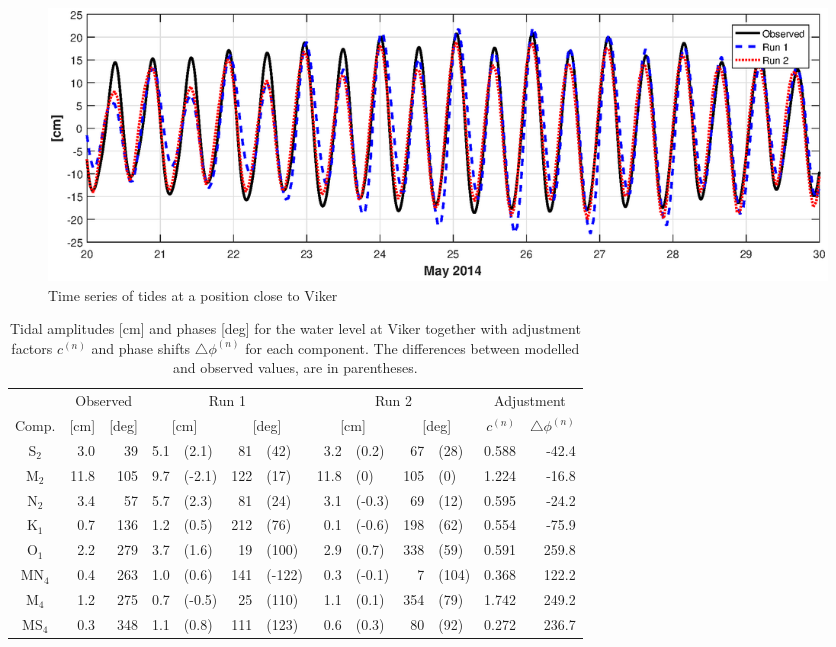 \begin{figure}[!t]
\centering
\includegraphics[width=\textwidth]{fig_Viker_timeseries}
\caption{Time series of tides at a position close to Viker}
\label{fig:Viker_timeseries}
\end{figure}



\begin{table}[ht]
\caption{Tidal amplitudes [cm] and phases [deg] for the water level at Viker  together with adjustment factors $c^{(n)}$ and phase shifts $\triangle \phi^{(n)}$ for each component. The differences between modelled and observed values, are in parentheses.}
\label{tab:Viker}
\centering
\begin{tabular}{crrr@{ }lr@{ }lr@{ }lr@{ }lrr} \hline
      & \multicolumn{2}{c}{Observed} & \multicolumn{4}{c}{Run 1} & \multicolumn{4}{c}{Run 2} & \multicolumn{2}{c}{Adjustment} \\
Comp. & [cm] & [deg] & \multicolumn{2}{c}{[cm]} & \multicolumn{2}{c}{[deg]} & \multicolumn{2}{c}{[cm]} & \multicolumn{2}{c}{[deg]} & $c^{(n)}$ & $\triangle \phi^{(n)}$  \\ \hline 
S$_2$  &   3.0 &  39 &  5.1 & (2.1)  &  81 & (42)   &  3.2 & (0.2)  &  67 & (28)  &  0.588 &   -42.4   \\
M$_2$  &  11.8 & 105 &  9.7 & (-2.1) & 122 & (17)   & 11.8 & (0)    & 105 & (0)   &  1.224 &   -16.8   \\
N$_2$  &   3.4 &  57 &  5.7 & (2.3)  &  81 & (24)   &  3.1 & (-0.3) &  69 & (12)  &  0.595 &   -24.2   \\
K$_1$  &   0.7 & 136 &  1.2 & (0.5)  & 212 & (76)   &  0.1 & (-0.6) & 198 & (62)  &  0.554 &   -75.9   \\
O$_1$  &   2.2 & 279 &  3.7 & (1.6)  &  19 & (100)  &  2.9 & (0.7)  & 338 & (59)  &  0.591 &   259.8   \\
MN$_4$ &   0.4 & 263 &  1.0 & (0.6)  & 141 & (-122) &  0.3 & (-0.1) &   7 & (104) &  0.368 &   122.2   \\
M$_4$  &   1.2 & 275 &  0.7 & (-0.5) &  25 & (110)  &  1.1 & (0.1)  & 354 & (79)  &  1.742 &   249.2   \\
MS$_4$ &   0.3 & 348 &  1.1 & (0.8)  & 111 & (123)  &  0.6 & (0.3)  &  80 & (92)  &  0.272 &   236.7   \\ \hline
\end{tabular}
\end{table}

